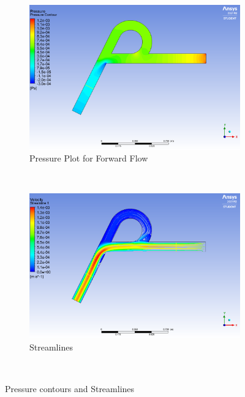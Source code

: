 \begin{figure}[H]
 \centering
\begin{subfigure}{.45\textwidth}
  \centering
  \includegraphics[width=.9\linewidth]{images/task1/6_pressures.png}
  \caption{Pressure Plot for Forward Flow}
  \label{fig:x_d_norm}
\end{subfigure}%
~
\begin{subfigure}{.45\textwidth}
  \centering
  \includegraphics[width=.9\linewidth]{images/task1/6_streamlines.png}
  \caption{Streamlines}
  \label{fig:x_d_norm_actual}
\end{subfigure}
~


\caption{Pressure contours and Streamlines}
\label{fig:press_stream}
\end{figure}